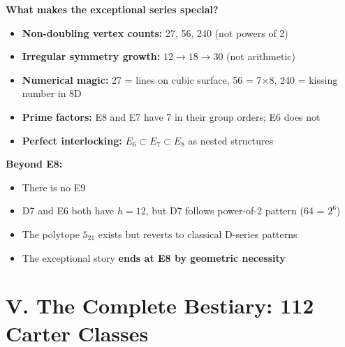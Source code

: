 \documentclass[11pt]{article}
\begin{document}
\textbf{What makes the exceptional series special?}

\begin{itemize}
\item \textbf{Non-doubling vertex counts:} 27, 56, 240 (not powers of 2)
\item \textbf{Irregular symmetry growth:} $12 \to 18 \to 30$ (not arithmetic)
\item \textbf{Numerical magic:} 27 = lines on cubic surface, 56 = 7×8, 240 = kissing number in 8D
\item \textbf{Prime factors:} E8 and E7 have 7 in their group orders; E6 does not
\item \textbf{Perfect interlocking:} $E_6 \subset E_7 \subset E_8$ as nested structures
\end{itemize}

\textbf{Beyond E8:}
\begin{itemize}
\item There is no E9
\item D7 and E6 both have $h=12$, but D7 follows power-of-2 pattern (64 = $2^6$)
\item The polytope $5_{21}$ exists but reverts to classical D-series patterns
\item The exceptional story \textbf{ends at E8 by geometric necessity}
\end{itemize}

\clearpage

\section*{V. The Complete Bestiary: 112 Carter Classes}
\end{document}
